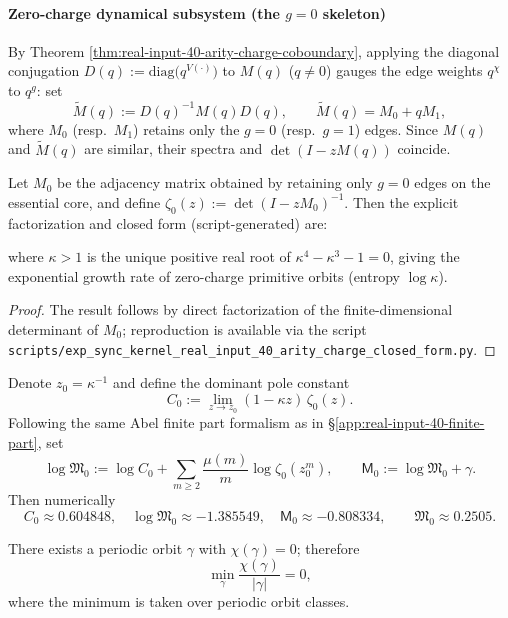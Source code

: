 \paragraph{Zero-charge dynamical subsystem (the $g=0$ skeleton)}
By Theorem \ref{thm:real-input-40-arity-charge-coboundary}, applying the diagonal conjugation
\(
D(q):=\mathrm{diag}\bigl(q^{V(\cdot)}\bigr)
\)
to $M(q)$ ($q\neq 0$) gauges the edge weights $q^{\chi}$ to $q^{g}$: set
\[
\widetilde M(q):=D(q)^{-1}M(q)D(q),
\qquad
\widetilde M(q)=M_0+qM_1,
\]
where $M_0$ (resp.\ $M_1$) retains only the $g=0$ (resp.\ $g=1$) edges. Since $M(q)$ and $\widetilde M(q)$ are similar, their spectra and $\det(I-zM(q))$ coincide.

\begin{proposition}\label{prop:real-input-40-arity-charge-zero-zeta}
Let $M_0$ be the adjacency matrix obtained by retaining only $g=0$ edges on the essential core, and define
\(
\zeta_0(z):=\det(I-zM_0)^{-1}
\).
Then the explicit factorization and closed form (script-generated) are:

where $\kappa>1$ is the unique positive real root of $\kappa^4-\kappa^3-1=0$, giving the exponential growth rate of zero-charge primitive orbits (entropy $\log\kappa$).
\end{proposition}

\begin{proof}
The result follows by direct factorization of the finite-dimensional determinant of $M_0$; reproduction is available via the script
\texttt{scripts/exp\_sync\_kernel\_real\_input\_40\_arity\_charge\_closed\_form.py}.
\end{proof}

\begin{proposition}\label{prop:real-input-40-arity-charge-zero-constants}
Denote $z_0=\kappa^{-1}$ and define the dominant pole constant
\[
C_0:=\lim_{z\to z_0}(1-\kappa z)\,\zeta_0(z).
\]
Following the same Abel finite part formalism as in \S\ref{app:real-input-40-finite-part}, set
\[
\log\mathfrak{M}_0:=\log C_0+\sum_{m\ge 2}\frac{\mu(m)}{m}\log\zeta_0(z_0^m),
\qquad
\mathsf{M}_0:=\log\mathfrak{M}_0+\gamma.
\]
Then numerically
\[
C_0\approx 0.604848,\quad
\log\mathfrak{M}_0\approx -1.385549,\quad
\mathsf{M}_0\approx -0.808334,
\qquad
\mathfrak{M}_0\approx 0.2505.
\]
\end{proposition}

\begin{corollary}\label{cor:real-input-40-arity-charge-min-average}
There exists a periodic orbit $\gamma$ with $\chi(\gamma)=0$; therefore
\[
\min_{\gamma}\frac{\chi(\gamma)}{|\gamma|}=0,
\]
where the minimum is taken over periodic orbit classes.
\end{corollary}

